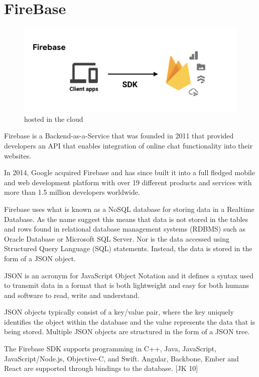 \section{FireBase}

\begin{figure}[ht]
    \centering
    \includegraphics[scale=0.8]{img/firebase2.PNG}
    \caption{hosted in the cloud}
    \label{fig:my_label}
\end{figure}

Firebase is a Backend-as-a-Service that was founded in 2011 that provided developers an API that enables integration of online chat functionality into their websites. 

In 2014, Google acquired Firebase and has since built it into a full fledged mobile and web development platform with over 19 different products and services with more than 1.5 million developers worldwide.

Firebase uses what is known as a NoSQL database for storing data in a Realtime Database. As the name suggest this means that data is not stored in the tables and rows found in relational database management systems (RDBMS) such as Oracle Database or Microsoft SQL Server. Nor is the data accessed using Structured Query Language (SQL) statements. Instead, the data is stored in the form of a JSON object. 

JSON is an acronym for JavaScript Object Notation and it defines a syntax used to transmit data in a format that is both lightweight and easy for both humans and software to read, write and understand.

JSON objects typically consist of a key/value pair, where the key uniquely identifies the object within the database and the value represents the data that is being stored. Multiple JSON objects are structured in the form of a JSON tree.

The Firebase SDK supports programming in C++, Java, JavaScript, JavaScript/Node.js, Objective-C, and Swift. Angular, Backbone, Ember and React are supported through bindings to the database. [JK 10]


